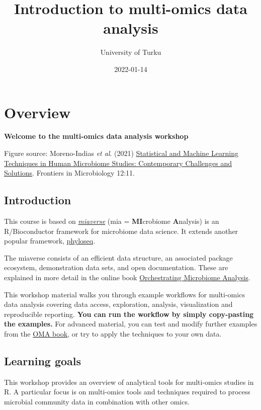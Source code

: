 \documentclass[
  oneside]{book}
\title{Introduction to multi-omics data analysis}
\author{University of Turku}
\date{2022-01-14}
\begin{document}
\maketitle

{
\setcounter{tocdepth}{1}
\tableofcontents
}
\hypertarget{overview}{%
\chapter{Overview}\label{overview}}

\textbf{Welcome to the multi-omics data analysis workshop}

Figure source: Moreno-Indias \emph{et al}. (2021) \href{https://doi.org/10.3389/fmicb.2021.635781}{Statistical and Machine Learning Techniques in Human Microbiome Studies: Contemporary Challenges and Solutions}. Frontiers in Microbiology 12:11.

\hypertarget{introduction}{%
\section{Introduction}\label{introduction}}

This course is based on \href{https://microbiome.github.io}{\emph{miaverse}} (mia = \textbf{MI}crobiome \textbf{A}nalysis) is an
R/Bioconductor framework for microbiome data science. It extends another popular framework, \href{https://joey711.github.io/phyloseq/}{phyloseq}.

The miaverse consists of an efficient data structure, an
associated package ecosystem, demonstration data sets, and open
documentation. These are explained in more detail in the online book
\href{https://microbiome.github.io/OMA}{Orchestrating Microbiome Analysis}.

This workshop material walks you through example workflows for multi-omics data
analysis covering data access, exploration, analysis, visualization and reproducible
reporting. \textbf{You can run the workflow by simply copy-pasting the
examples.} For advanced material, you can test and modify further
examples from the \href{https://microbiome.github.io/OMA}{OMA book}, or try
to apply the techniques to your own data.

\hypertarget{learning-goals}{%
\section{Learning goals}\label{learning-goals}}

This workshop provides an overview of analytical
tools for multi-omics studies in R. A particular focus is on multi-omics tools and techniques
required to process microbial community data in combination with other omics.
\end{document}
